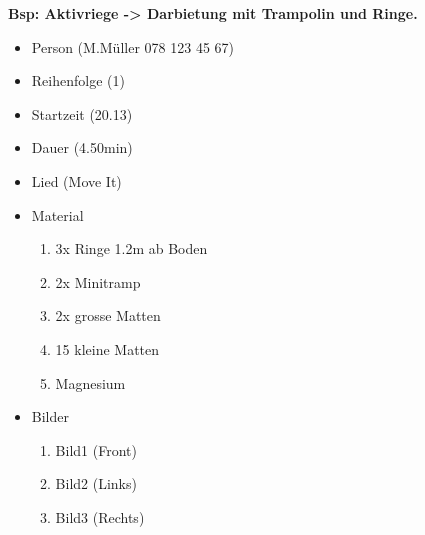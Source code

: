 \documentclass[12pt, a4paper]{article}
\begin{document}
\large{\textbf{ Bsp: Aktivriege -> Darbietung mit Trampolin und Ringe.}}

\begin{itemize}
\item Person (M.Müller 078 123 45 67)
\item Reihenfolge (1)
\item Startzeit (20.13)
\item Dauer (4.50min)
\item Lied (Move It)
\item Material 
\begin{enumerate}
\item 3x Ringe 1.2m ab Boden
\item 2x Minitramp
\item 2x grosse Matten
\item 15 kleine Matten
\item Magnesium
\end{enumerate} 
\item Bilder 
\begin{enumerate}
\item Bild1 (Front)
\item Bild2 (Links)
\item Bild3 (Rechts)
\end{enumerate}
\end{itemize}
\end{document}
